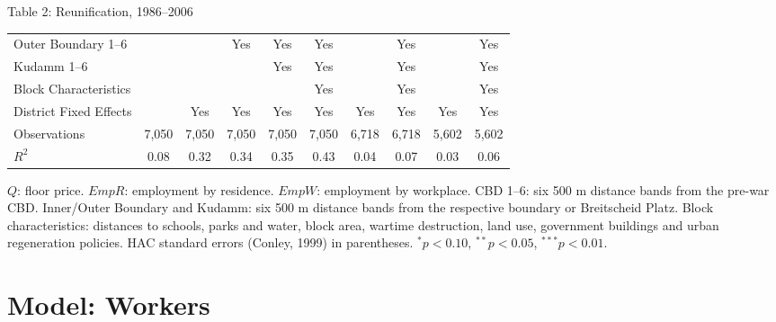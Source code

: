 \documentclass[aspectratio=169,11pt]{beamer}
\begin{document}
\begin{frame}{Table 2: Reunification, 1986--2006}
{\begin{tabular}{@{}l*{9}{c}@{}}
Outer Boundary 1--6 &  &  & Yes & Yes & Yes &  & Yes &  & Yes \\
Kudamm 1--6 &  &  &  & Yes & Yes &  & Yes &  & Yes \\
Block Characteristics &  &  &  &  & Yes &  & Yes &  & Yes \\
District Fixed Effects &  & Yes & Yes & Yes & Yes & Yes & Yes & Yes & Yes \\
Observations & 7,050 & 7,050 & 7,050 & 7,050 & 7,050 & 6,718 & 6,718 & 5,602 & 5,602 \\
$R^2$ & 0.08 & 0.32 & 0.34 & 0.35 & 0.43 & 0.04 & 0.07 & 0.03 & 0.06 \\
\bottomrule
  \end{tabular}}
  \vspace{0.35em}
  \parbox{\textwidth}{\fontsize{5.5}{6.5}\selectfont
  $Q$: floor price. $EmpR$: employment by residence. $EmpW$: employment by workplace.
  CBD 1--6: six 500 m distance bands from the pre-war CBD.
  Inner/Outer Boundary and Kudamm: six 500 m distance bands from the respective boundary or Breitscheid Platz.
  Block characteristics: distances to schools, parks and water, block area, wartime destruction, land use,
  government buildings and urban regeneration policies.
  HAC standard errors (Conley, 1999) in parentheses.
  $^{*}p<0.10$, $^{**}p<0.05$, $^{***}p<0.01$.}
\end{frame}


\section{Model: Workers}
\end{document}
